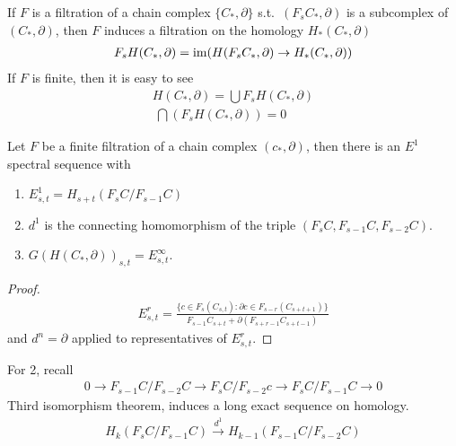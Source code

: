 \documentclass[12pt,class=article,crop=false]{standalone}
\begin{document}
If $ F$ is a filtration of a chain complex $ \{C_*, \partial \} $ s.t.\ $ (F_s C_*, \partial )$ is a subcomplex of $ (C_*, \partial )$, then $ F$ induces a filtration on the homology  $ H_*(C_*, \partial )$
\begin{align*}
	F_s H(C_*, \partial ) = \operatorname{im}  (H(F_s C_*, \partial ) \to H_*(C_*,\partial ))
\end{align*}
If $ F$ is finite, then it is easy to see
 \begin{align*}
	H(C_*, \partial ) = \bigcup F_s H(C_*, \partial )\\\
	\bigcap (F_s H(C_*, \partial )) =0
\end{align*}
\begin{thm}
Let $ F$ be a finite filtration of a chain complex  $ (c_*, \partial )$, then there is an $ E^{1}$ spectral sequence with
\begin{enumerate}[label=(\arabic*)]
	\item $ E^{1}_{s,t} = H_{s+t}(F_s C / F_{s-1}C)$ 
	\item $ d^{1}$ is the connecting homomorphism of the triple $ (F_s C, F_{s-1}C,F_{s-2}C)$.
	\item $ G(H(C_*, \partial ))_{s,t} = E_{s,t}^{\infty}$.
\end{enumerate}
\end{thm}
\begin{proof}
\begin{align*}
	E_{s,t}^{r} = \frac{ \{ c \in F_s(C_{s,t}): \partial c \in F_{s-r} (C_{s+t+1})\}}{F_{s-1}C_{s+t} + \partial (F_{s+r-1} C_{s+t-1}) }
\end{align*}
and $ d^{n} = \partial $ applied to representatives of $ E_{s,t}^{r}$.
\end{proof}
For 2, recall
\begin{align*}
	0 \to F_{s-1}C / F_{s-2}C \to F_{s}C / F_{s-2} c \to F_s C / F_{s-1} C \to 0
\end{align*}
Third isomorphism theorem, induces a long exact sequence on homology.
\begin{align*}
	 H_k(F_s C / F_{s-1}C) \xrightarrow{ d^{1}} H_{k-1} (F_{s-1}C / F_{s-2}C) 
\end{align*}
\end{document}
